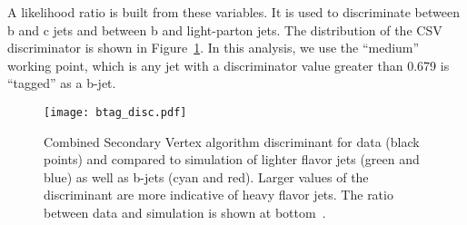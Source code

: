 A likelihood ratio is built from these variables. It is used to discriminate
between b and c jets and between b and light-parton jets. The distribution
of the CSV discriminator is shown in Figure~\ref{fig:cms_btag_disc}. In
this analysis, we use the ``medium'' working point, which is any jet with a
discriminator value greater than 0.679 is ``tagged'' as a b-jet.
\begin{figure}[!hbt]
\begin{center}
\texttt{[image: btag\_disc.pdf]}
\caption[Combined Secondary Vertex algorithm discriminant for data and simulation.]
{\label{fig:cms_btag_disc}
Combined Secondary Vertex algorithm  discriminant for
data (black points) and compared to simulation of lighter flavor jets (green
and blue) as well as b-jets (cyan and red).  Larger values of the discriminant
are more indicative of heavy flavor jets.  The ratio between data and simulation
is shown at bottom~\cite{btagging}.
}
\end{center}
\end{figure} 


